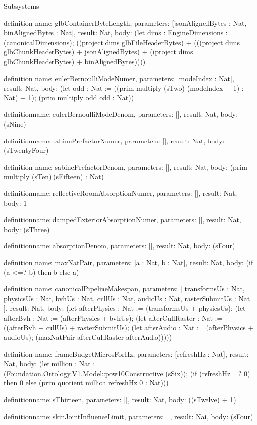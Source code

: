 \begin{lexlean}{Subsystems}
\begin{semanticmodule}
definition{
  name: glbContainerByteLength,
  parameters: [jsonAlignedBytes : Nat, binAlignedBytes : Nat],
  result: Nat,
  body: (let dims : EngineDimensions := (canonicalDimensions); ((project dims glbFileHeaderBytes) + (((project dims glbChunkHeaderBytes) + jsonAlignedBytes) + ((project dims glbChunkHeaderBytes) + binAlignedBytes))))
}

definition{
  name: eulerBernoulliModeNumer,
  parameters: [modeIndex : Nat],
  result: Nat,
  body: (let odd : Nat := ((prim multiply (sTwo) (modeIndex + 1) : Nat) + 1); (prim multiply odd odd : Nat))
}

definition{name: eulerBernoulliModeDenom, parameters: [], result: Nat, body: (sNine)}

definition{name: sabinePrefactorNumer, parameters: [], result: Nat, body: (sTwentyFour)}

definition{
  name: sabinePrefactorDenom,
  parameters: [],
  result: Nat,
  body: (prim multiply (sTen) (sFifteen) : Nat)
}

definition{name: reflectiveRoomAbsorptionNumer, parameters: [], result: Nat, body: 1}

definition{name: dampedExteriorAbsorptionNumer, parameters: [], result: Nat, body: (sThree)}

definition{name: absorptionDenom, parameters: [], result: Nat, body: (sFour)}

definition{
  name: maxNatPair,
  parameters: [a : Nat, b : Nat],
  result: Nat,
  body: (if (a <=? b) then b else a)
}

definition{
  name: canonicalPipelineMakespan,
  parameters: [
    transformsUs : Nat,
    physicsUs : Nat,
    bvhUs : Nat,
    cullUs : Nat,
    audioUs : Nat,
    rasterSubmitUs : Nat
  ],
  result: Nat,
  body: (let afterPhysics : Nat := (transformsUs + physicsUs); (let afterBvh : Nat := (afterPhysics + bvhUs); (let afterCullRaster : Nat := ((afterBvh + cullUs) + rasterSubmitUs); (let afterAudio : Nat := (afterPhysics + audioUs); (maxNatPair afterCullRaster afterAudio)))))
}

definition{
  name: frameBudgetMicrosForHz,
  parameters: [refreshHz : Nat],
  result: Nat,
  body: (let million : Nat := (Foundation.Ontology.V1.Model::pow10Constructive (sSix)); (if (refreshHz =? 0) then 0 else (prim quotient million refreshHz 0 : Nat)))
}

definition{name: sThirteen, parameters: [], result: Nat, body: ((sTwelve) + 1)}

definition{name: skinJointInfluenceLimit, parameters: [], result: Nat, body: (sFour)}


\end{semanticmodule}
\end{lexlean}
